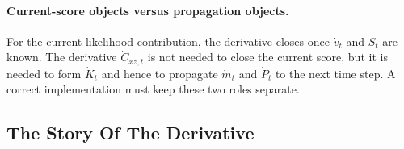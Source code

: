 \documentclass[11pt]{article}
\numberwithin{equation}{section}
\begin{document}
\paragraph{Current-score objects versus propagation objects.}
For the current likelihood contribution, the derivative closes once
\(\dot v_t\) and \(\dot S_t\) are known.  The derivative
\(\dot C_{xz,t}\) is not needed to close the current score, but it is needed to
form \(\dot K_t\) and hence to propagate \(\dot m_t\) and \(\dot P_t\) to the next
time step.  A correct implementation must keep these two roles separate.

\subsection{The Story Of The Derivative}
\label{subsec:p32-gradient-story}
\end{document}
